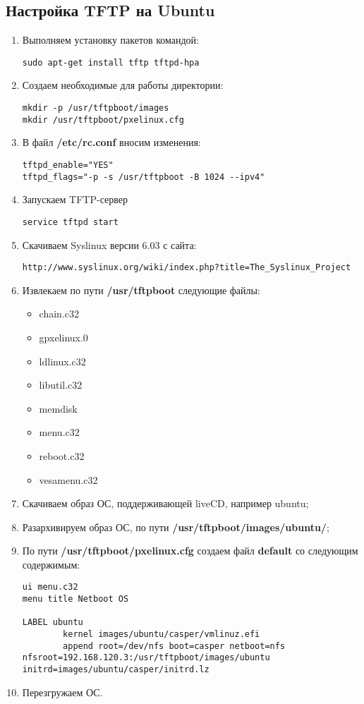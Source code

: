 \documentclass[a4paper, 12pt]{article}		%
\begin{document}
\subsection{Настройка TFTP на Ubuntu}
\begin{enumerate}
\item Выполняем установку пакетов командой:
\begin{lstlisting}[language={}]
sudo apt-get install tftp tftpd-hpa
\end{lstlisting}
\item Создаем необходимые для работы директории:
\begin{lstlisting}[language={}]
mkdir -p /usr/tftpboot/images
mkdir /usr/tftpboot/pxelinux.cfg
\end{lstlisting}
\item В файл \textbf{/etc/rc.conf} вносим изменения:
\begin{lstlisting}[language={}]
tftpd_enable="YES"
tftpd_flags="-p -s /usr/tftpboot -B 1024 --ipv4"
\end{lstlisting}
\item Запускаем TFTP-сервер
\begin{lstlisting}[language={}]
service tftpd start
\end{lstlisting}
\item Скачиваем Syslinux версии 6.03 с сайта:
\begin{lstlisting}[language={}]
http://www.syslinux.org/wiki/index.php?title=The_Syslinux_Project
\end{lstlisting}
\item Извлекаем по пути \textbf{/usr/tftpboot} следующие файлы:
\begin{multicols}{2}
\begin{itemize}
\item chain.c32
\item gpxelinux.0
\item ldlinux.c32
\item libutil.c32
\item memdisk
\item menu.c32
\item reboot.c32
\item vesamenu.c32
\end{itemize}
\end{multicols}
\item Скачиваем образ ОС, поддерживающей liveCD, например ubuntu;
\item Разархивируем образ ОС, по пути \textbf{/usr/tftpboot/images/ubuntu/};
\item По пути \textbf{/usr/tftpboot/pxelinux.cfg} создаем файл \textbf{default} со следующим содержимым:
\begin{lstlisting}[language={}]
ui menu.c32
menu title Netboot OS

LABEL ubuntu
        kernel images/ubuntu/casper/vmlinuz.efi
        append root=/dev/nfs boot=casper netboot=nfs nfsroot=192.168.120.3:/usr/tftpboot/images/ubuntu initrd=images/ubuntu/casper/initrd.lz 
\end{lstlisting}
\item Перезгружаем ОС.
\end{enumerate}
\end{document}
